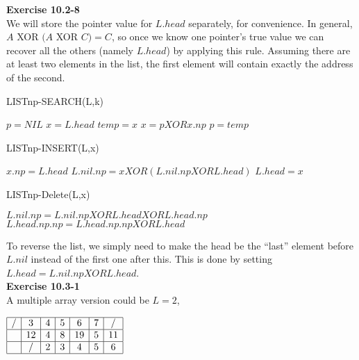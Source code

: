 \documentclass{article}
\begin{document}
\noindent\textbf{Exercise 10.2-8}\\

We will store the pointer value for $L.head$ separately, for convenience.  In general, $A$ XOR $(A$ XOR $ C) = C$, so once we know one pointer's true value we can recover all the others (namely $L.head$) by applying this rule. Assuming there are at least two elements in the list, the first element will contain exactly the address of the second. 

\begin{algorithm}
\caption{LISTnp-SEARCH(L,k)}
\begin{algorithmic}
\State $p = NIL$
\State $x=L.head$
	\State $temp = x$
	\State $x = p XOR x.np$
	\State $p = temp$
\EndWhile
\end{algorithmic}
\end{algorithm}


\begin{algorithm}
\caption{LISTnp-INSERT(L,x)}
\begin{algorithmic}
\State $x.np = L.head$
\State $L.nil.np = x XOR (L.nil.np XOR L.head)$
\State $L.head = x$
\end{algorithmic}
\end{algorithm}

\begin{algorithm}
\caption{LISTnp-Delete(L,x)}
\begin{algorithmic}
\State $L.nil.np = L.nil.np XOR L.head XOR L.head.np$
\State $L.head.np.np = L.head.np.np XOR L.head$
\end{algorithmic}
\end{algorithm}

To reverse the list, we simply need to make the head be the ``last'' element before $L.nil$ instead of the first one after this.  This is done by setting $L.head = L.nil.np XOR L.head$. \\

\noindent\textbf{ Exercise 10.3-1} \\

A multiple array version could be $L=2$,

$
\begin{array}{|c|c|c|c|c|c|c|}
\hline
/&3&4&5&6&7&/\\

\hline
&12&4&8&19&5&11\\

\hline
&/&2&3&4&5&6\\

\hline
\end{array}
$
\end{document}
